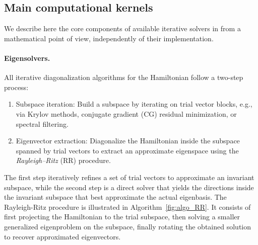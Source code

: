 \documentclass[twocolumn,superscriptaddress]{revtex4-1}
\begin{document}
\subsection{Main computational kernels}

We describe here the core components of available iterative solvers in \abinit from a mathematical point of view, independently of their implementation.

\paragraph{Eigensolvers.} All iterative diagonalization algorithms for the Hamiltonian follow a two-step process:

\begin{enumerate}[label=(\roman*)]
\item Subspace iteration: Build a subspace by iterating on trial vector blocks, e.g., via Krylov methods, conjugate gradient (CG) residual minimization, or spectral filtering.
\item Eigenvector extraction: Diagonalize the Hamiltonian inside the subspace spanned by trial vectors to extract an approximate eigenspace using the \textit{Rayleigh–Ritz} (RR) procedure.
\end{enumerate}
The first step iteratively refines a set of trial vectors to approximate an invariant subspace, while the second step is a direct solver that yields the directions inside the invariant subspace that best approximate the actual eigenbasis. The Rayleigh-Ritz procedure is illustrated in Algorithm~\ref{fig:algo_RR}. It consists of first projecting the Hamiltonian to the trial subspace, then solving a smaller generalized eigenproblem on the subspace, finally rotating the obtained solution to recover approximated eigenvectors.
\end{document}
